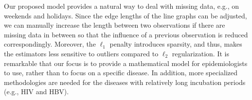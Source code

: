 Our proposed model provides a natural way to deal with missing data, e.g., on weekends and holidays. Since the edge lengths of the line graphs can be adjusted, we can manually increase the length between two observations if there are missing data in between so that the influence of a previous observation is reduced correspondingly. Moreover, the $\ell_1$ penalty introduces sparsity, and thus, makes the estimators less sensitive to outliers compared to $\ell_2$ regularization. 
It is remarkable that our focus is to provide a mathematical model for epidemiologists to use, rather than to focus on a specific disease. In addition, more specialized methodologies are needed for the diseases with relatively long incubation periods (e.g., HIV and HBV). 





